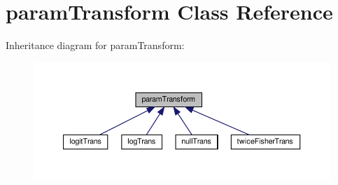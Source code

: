 \hypertarget{classparamTransform}{}\section{param\+Transform Class Reference}
\label{classparamTransform}


Inheritance diagram for param\+Transform\+:
\nopagebreak
\begin{figure}[H]
\begin{center}
\leavevmode
\includegraphics[width=350pt]{classparamTransform__inherit__graph}
\end{center}
\end{figure}
